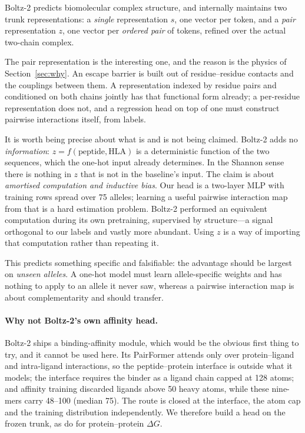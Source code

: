 \documentclass[11pt,a4paper]{article}
\begin{document}
Boltz-2 \citep{boltz2} predicts biomolecular complex structure, and internally
maintains two trunk representations: a \emph{single} representation $s$, one
vector per token, and a \emph{pair} representation $z$, one vector per
\emph{ordered pair} of tokens, refined over the actual two-chain complex.

The pair representation is the interesting one, and the reason is the physics of
Section~\ref{sec:why}. An escape barrier is built out of residue--residue
contacts and the couplings between them. A representation indexed by residue
pairs and conditioned on both chains jointly has that functional form already;
a per-residue representation does not, and a regression head on top of one must
construct pairwise interactions itself, from labels.

It is worth being precise about what is and is not being claimed. Boltz-2 adds
no \emph{information}: $z = f(\text{peptide}, \text{HLA})$ is a deterministic
function of the two sequences, which the one-hot input already determines. In
the Shannon sense there is nothing in $z$ that is not in the baseline's input.
The claim is about \emph{amortised computation and inductive bias}. Our head is
a two-layer MLP with \ntrain{} training rows spread over 75 alleles; learning a
useful pairwise interaction map from that is a hard estimation problem. Boltz-2
performed an equivalent computation during its own pretraining, supervised by
structure---a signal orthogonal to our labels and vastly more abundant. Using
$z$ is a way of importing that computation rather than repeating it.

This predicts something specific and falsifiable: the advantage should be
largest on \emph{unseen alleles}. A one-hot model must learn allele-specific
weights and has nothing to apply to an allele it never saw, whereas a pairwise
interaction map is about complementarity and should transfer.

\paragraph{Why not Boltz-2's own affinity head.}
Boltz-2 ships a binding-affinity module, which would be the obvious first
thing to try, and it cannot be used here. Its PairFormer attends only over
protein--ligand and intra-ligand interactions, so the peptide--protein
interface is outside what it models; the interface requires the binder as a
ligand chain capped at 128 atoms; and affinity training discarded ligands above
50 heavy atoms, while these nine-mers carry 48--100 (median 75). The route is
closed at the interface, the atom cap and the training distribution
independently. We therefore build a head on the frozen trunk, as
\citet{prefolddg} do for protein--protein $\Delta G$.
\end{document}
